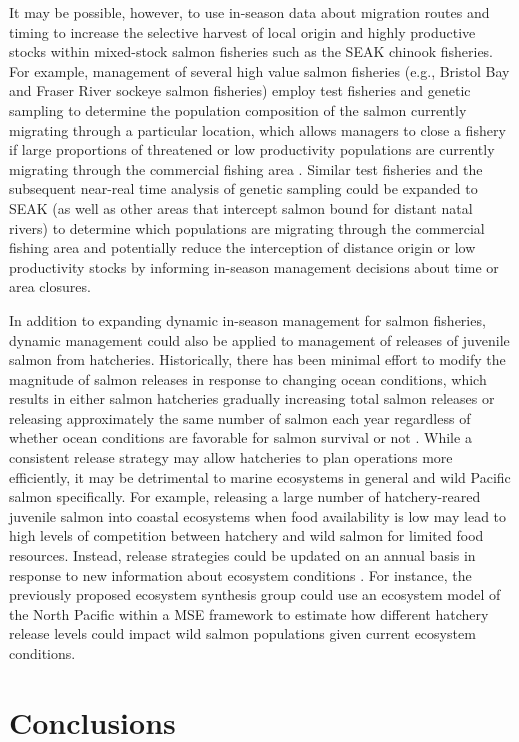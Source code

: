 It may be possible, however, to use in-season data about migration
routes and timing to increase the selective harvest of local origin and
highly productive stocks within mixed-stock salmon fisheries such as the
SEAK chinook fisheries. For example, management of several high value
salmon fisheries (e.g., Bristol Bay and Fraser River sockeye salmon
fisheries) employ test fisheries and genetic sampling to determine the
population composition of the salmon currently migrating through a
particular location, which allows managers to close a fishery if large
proportions of threatened or low productivity populations are currently
migrating through the commercial fishing area \citep{Dann2013}. Similar
test fisheries and the subsequent near-real time analysis of genetic
sampling could be expanded to SEAK (as well as other areas that
intercept salmon bound for distant natal rivers) to determine which
populations are migrating through the commercial fishing area and
potentially reduce the interception of distance origin or low
productivity stocks by informing in-season management decisions about
time or area closures.

In addition to expanding dynamic in-season management for salmon
fisheries, dynamic management could also be applied to management of
releases of juvenile salmon from hatcheries. Historically, there has
been minimal effort to modify the magnitude of salmon releases in
response to changing ocean conditions, which results in either salmon
hatcheries gradually increasing total salmon releases or releasing
approximately the same number of salmon each year regardless of whether
ocean conditions are favorable for salmon survival or not
\citep{Pearsons2010a}. While a consistent release strategy may allow
hatcheries to plan operations more efficiently, it may be detrimental to
marine ecosystems in general and wild Pacific salmon specifically. For
example, releasing a large number of hatchery-reared juvenile salmon
into coastal ecosystems when food availability is low may lead to high
levels of competition between hatchery and wild salmon for limited food
resources. Instead, release strategies could be updated on an annual
basis in response to new information about ecosystem conditions
\citep{Pearsons2010a, Peterman1983a}. For instance, the previously
proposed ecosystem synthesis group could use an ecosystem model of the
North Pacific within a MSE framework to estimate how different hatchery
release levels could impact wild salmon populations given current
ecosystem conditions.

\section{Conclusions}


